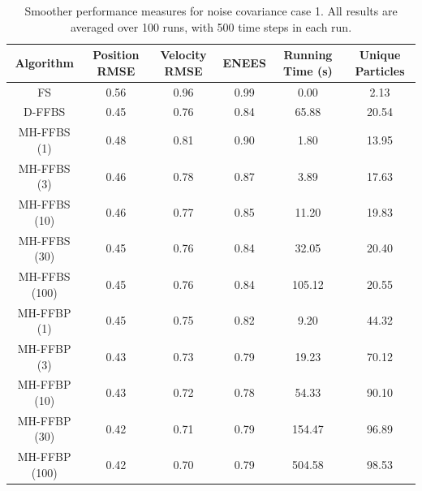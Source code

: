 \documentclass[10pt,twocolumn,twoside]{IEEEtran}
\begin{document}
\begin{table}[!t]%
\renewcommand{\arraystretch}{1.3}
\caption{Smoother performance measures for noise covariance case 1. All results are averaged over 100 runs, with 500 time steps in each run.}
\label{tab:case1_performance}
{\scriptsize
\centering
\begin{tabular}{|c||c|c|c|c|c|}
\hline
Algorithm & \begin{minipage}[c]{0.9cm} Position RMSE \end{minipage} & \begin{minipage}[c]{0.9cm}  Velocity RMSE \end{minipage} & \begin{minipage}[c]{0.9cm}  ENEES \end{minipage} & \begin{minipage}[c]{0.9cm}  Running Time (s) \end{minipage} & \begin{minipage}[c]{0.9cm}  Unique Particles \end{minipage} \\
\hline
FS             & 0.56 & 0.96 & 0.99 & 0.00 & 2.13 \\
D-FFBS         & 0.45 & 0.76 & 0.84 & 65.88 & 20.54 \\
\hline
MH-FFBS (1)    & 0.48 & 0.81 & 0.90 & 1.80 & 13.95 \\
MH-FFBS (3)    & 0.46 & 0.78 & 0.87 & 3.89 & 17.63 \\
MH-FFBS (10)   & 0.46 & 0.77 & 0.85 & 11.20 & 19.83 \\
MH-FFBS (30)   & 0.45 & 0.76 & 0.84 & 32.05 & 20.40 \\
MH-FFBS (100)  & 0.45 & 0.76 & 0.84 & 105.12 & 20.55 \\
\hline
MH-FFBP (1)    & 0.45 & 0.75 & 0.82 & 9.20 & 44.32 \\
MH-FFBP (3)    & 0.43 & 0.73 & 0.79 & 19.23 & 70.12 \\
MH-FFBP (10)   & 0.43 & 0.72 & 0.78 & 54.33 & 90.10 \\
MH-FFBP (30)   & 0.42 & 0.71 & 0.79 & 154.47 & 96.89 \\
MH-FFBP (100)  & 0.42 & 0.70 & 0.79 & 504.58 & 98.53 \\
\hline

\end{tabular}
}
\end{table}
\end{document}
